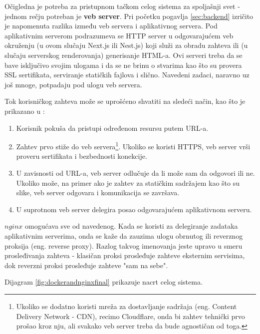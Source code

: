 \documentclass[12pt,oneside]{memoir}
\begin{document}
Očigledna je potreba za pristupnom tačkom celog sistema za spoljašnji svet - jednom rečju potreban je \textbf{veb server}. Pri početku pogavlja \ref{sec:backend} izričito je napomenuta razlika između veb servera i aplikativnog servera. Pod aplikativnim serverom podrazumeva se HTTP server u odgovarajućem veb okruženju (u ovom slučaju Next.js ili Nest.js) koji služi za obradu zahteva ili (u slučaju serverskog renderovanja) generisanje HTML-a. Ovi serveri treba da se bave isključivo svojim ulogama i da se ne brinu o stvarima kao što su provera SSL sertifikata, serviranje statičkih fajlova i slično. Navedeni zadaci, naravno uz još mnoge, potpadaju pod ulogu veb servera.

Tok korisničkog zahteva može se uprošćeno shvatiti na sledeći način, kao što je prikazano u \cite{webvsappserver}:
\begin{enumerate}
    \item Korisnik pokuša da pristupi određenom resursu putem URL-a.
    \item Zahtev prvo stiže do veb servera\footnote{Ukoliko se dodatno koristi mreža za dostavljanje sadržaja (eng. Content Delivery Network - CDN), recimo Cloudflare, onda bi zahtev tehnički prvo prošao kroz nju, ali svakako veb server treba da bude agnostičan od toga.}. Ukoliko se koristi HTTPS, veb server vrši proveru sertifikata i bezbednosti konekcije.
    \item U zavisnosti od URL-a, veb server odlučuje da li može sam da odgovori ili ne. Ukoliko može, na primer ako je zahtev za statičkim sadržajem kao što su slike, veb server odgovara i komunikacija se završava.
    \item U suprotnom veb server delegira posao odgovarajućem aplikativnom serveru.
\end{enumerate}

$nginx$ \cite{nginxdocs} omogućava sve od navedenog. Kada se koristi za delegiranje zadataka aplikativnim serverima, onda se kaže da zauzima ulogu obrnutog ili reverznog proksija (eng. reverse proxy). Razlog takvog imenovanja jeste upravo u smeru prosleđivanja zahteva - klasičan proksi prosleđuje zahteve eksternim servisima, dok reverzni proksi prosleđuje zahteve "sam na sebe". 

Dijagram \ref{fig:dockerandnginxfinal} prikazuje nacrt celog sistema.
\end{document}
